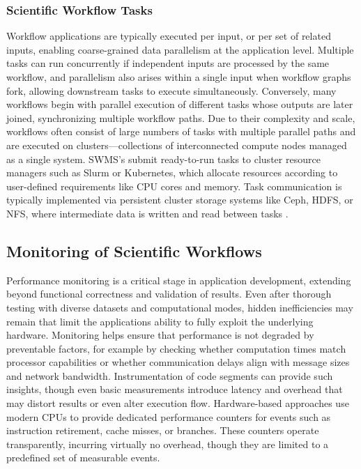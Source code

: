 \subsubsection{Scientific Workflow Tasks}
\label{sec:background_workflows_examples}
Workflow applications are typically executed per input, or per set of related inputs, enabling coarse-grained data parallelism at the application level. Multiple tasks can run concurrently if independent inputs are processed by the same workflow, and parallelism also arises within a single input when workflow graphs fork, allowing downstream tasks to execute simultaneously. Conversely, many workflows begin with parallel execution of different tasks whose outputs are later joined, synchronizing multiple workflow paths.
Due to their complexity and scale, workflows often consist of large numbers of tasks with multiple parallel paths and are executed on clusters—collections of interconnected compute nodes managed as a single system. SWMS's submit ready-to-run tasks to cluster resource managers such as Slurm or Kubernetes, which allocate resources according to user-defined requirements like CPU cores and memory. Task communication is typically implemented via persistent cluster storage systems like Ceph, HDFS, or NFS, where intermediate data is written and read between tasks \cite{thamsen2025energyawareworkflowexecutionoverview}.


\subsection{Monitoring of Scientific Workflows}
\label{sec:background_monitoring}
Performance monitoring is a critical stage in application development, extending beyond functional correctness and validation of results. Even after thorough testing with diverse datasets and computational modes, hidden inefficiencies may remain that limit the applications ability to fully exploit the underlying hardware. Monitoring helps ensure that performance is not degraded by preventable factors, for example by checking whether computation times match processor capabilities or whether communication delays align with message sizes and network bandwidth. Instrumentation of code segments can provide such insights, though even basic measurements introduce latency and overhead that may distort results or even alter execution flow. Hardware-based approaches use modern CPUs to provide dedicated performance counters for events such as instruction retirement, cache misses, or branches. These counters operate transparently, incurring virtually no overhead, though they are limited to a predefined set of measurable events.

